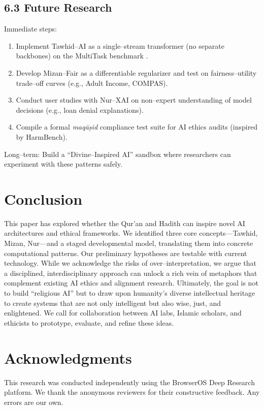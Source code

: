 \documentclass[12pt,twocolumn]{article}
\begin{document}
\subsection*{6.3 Future Research}
Immediate steps:
\begin{enumerate}[leftmargin=*, label=\arabic*.]
\item Implement Tawhid--AI as a single--stream transformer (no separate backbones) on the MultiTask benchmark \citep{MTL}.
\item Develop Mizan--Fair as a differentiable regularizer and test on fairness--utility trade--off curves (e.g., Adult Income, COMPAS).
\item Conduct user studies with Nur--XAI on non--expert understanding of model decisions (e.g., loan denial explanations).
\item Compile a formal \emph{maqāṣid} compliance test suite for AI ethics audits (inspired by HarmBench).
\end{enumerate}
Long--term: Build a ``Divine--Inspired AI'' sandbox where researchers can experiment with these patterns safely.

\section{Conclusion}
This paper has explored whether the Qur'an and Hadith can inspire novel AI architectures and ethical frameworks. We identified three core concepts—Tawhid, Mizan, Nur—and a staged developmental model, translating them into concrete computational patterns. Our preliminary hypotheses are testable with current technology. While we acknowledge the risks of over--interpretation, we argue that a disciplined, interdisciplinary approach can unlock a rich vein of metaphors that complement existing AI ethics and alignment research. Ultimately, the goal is not to build ``religious AI'' but to draw upon humanity's diverse intellectual heritage to create systems that are not only intelligent but also wise, just, and enlightened. We call for collaboration between AI labs, Islamic scholars, and ethicists to prototype, evaluate, and refine these ideas.

\section*{Acknowledgments}
This research was conducted independently using the BrowserOS Deep Research platform. We thank the anonymous reviewers for their constructive feedback. Any errors are our own.
\end{document}
